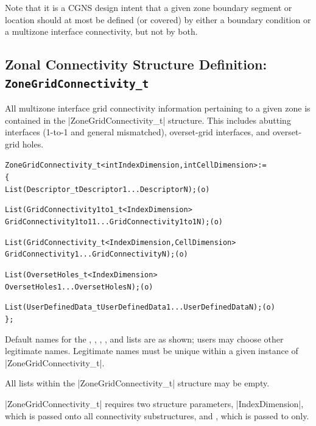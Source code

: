 Note that it is a CGNS design intent that a given zone boundary segment
or location should at most be defined (or covered) by either a boundary
condition or a multizone interface connectivity, but not by both.

\subsection{Zonal Connectivity Structure Definition: \texttt{ZoneGridConnectivity\_t}} 
\label{s:ZoneGridConnectivity}

All multizone interface grid connectivity information pertaining to
a given zone is contained in the |ZoneGridConnectivity_t| structure.
This includes abutting interfaces (1-to-1 and general mismatched),
overset-grid interfaces, and overset-grid holes.

\begin{alltt}
  ZoneGridConnectivity\_t< int IndexDimension, int CellDimension > :=
    \{
    List( Descriptor\_t Descriptor1 ... DescriptorN ) ;                      (o)

    List( GridConnectivity1to1\_t<IndexDimension>
          GridConnectivity1to11 ... GridConnectivity1to1N ) ;               (o)

    List( GridConnectivity\_t<IndexDimension, CellDimension>
          GridConnectivity1 ... GridConnectivityN ) ;                       (o)

    List( OversetHoles\_t<IndexDimension> 
          OversetHoles1 ... OversetHolesN ) ;                               (o)

    List( UserDefinedData\_t UserDefinedData1 ... UserDefinedDataN ) ;       (o)
    \} ;
\end{alltt}

\begin{notes}
\item
 Default names for the , ,
 , , and
 lists are as shown; users may choose other legitimate names.
 Legitimate names must be unique 
 within a given instance of |ZoneGridConnectivity_t|.
\item
 All lists within the |ZoneGridConnectivity_t| structure may be empty.
\end{notes}

|ZoneGridConnectivity_t| requires two structure parameters,
|IndexDimension|, which is passed onto all connectivity substructures, and
, which is passed to  only.

